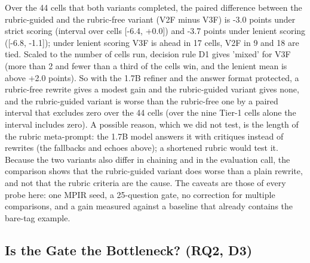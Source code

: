 \documentclass{ieeeaccess}
\begin{document}
Over the 44 cells that both variants completed, the paired difference between the rubric-guided and the rubric-free variant (V2F minus V3F) is -3.0 points under strict scoring (interval over cells [-6.4, +0.0]) and -3.7 points under lenient scoring ([-6.8, -1.1]); under lenient scoring V3F is ahead in 17 cells, V2F in 9 and 18 are tied. Scaled to the number of cells run, decision rule D1 gives 'mixed' for V3F (more than 2 and fewer than a third of the cells win, and the lenient mean is above +2.0 points). So with the 1.7B refiner and the answer format protected, a rubric-free rewrite gives a modest gain and the rubric-guided variant gives none, and the rubric-guided variant is worse than the rubric-free one by a paired interval that excludes zero over the 44 cells (over the nine Tier-1 cells alone the interval includes zero). A possible reason, which we did not test, is the length of the rubric meta-prompt: the 1.7B model answers it with critiques instead of rewrites (the fallbacks and echoes above); a shortened rubric would test it. Because the two variants also differ in chaining and in the evaluation call, the comparison shows that the rubric-guided variant does worse than a plain rewrite, and not that the rubric criteria are the cause. The caveats are those of every probe here: one MPIR seed, a 25-question gate, no correction for multiple comparisons, and a gain measured against a baseline that already contains the bare-tag example.

\subsection{Is the Gate the Bottleneck? (RQ2, D3)}
\end{document}

